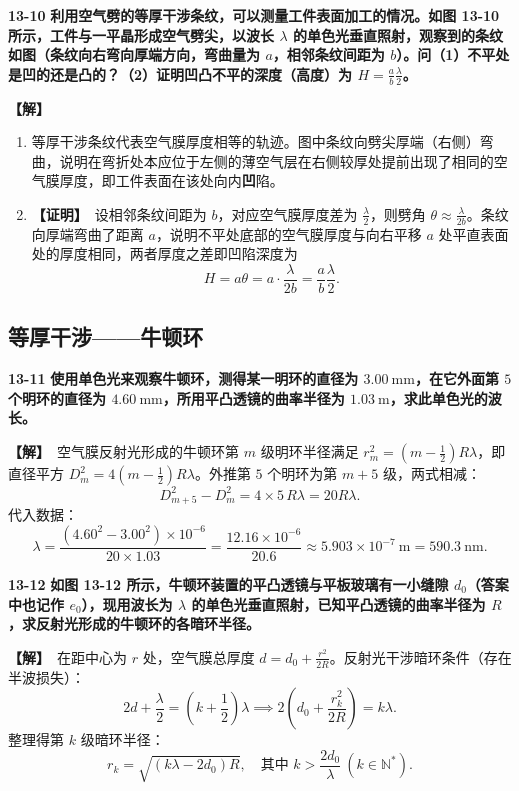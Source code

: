 \documentclass[zihao=5,a4paper,UTF8]{ctexart}
\newenvironment{prob}[2]{%
    \par\vspace{6pt}\noindent\textbf{\color{navy}#1} \textbf{#2}\par\nopagebreak\vspace{2pt}%
}{%
    \par\vspace{4pt}%
}
\newcommand{\sol}{\noindent\textbf{\color{tealaccent}【解】}\ }
\newcommand{\proofbegin}{\noindent\textbf{\color{tealaccent}【证明】}\ }
\begin{document}
\begin{prob}{13-10}{利用空气劈的等厚干涉条纹，可以测量工件表面加工的情况。如图 13-10 所示，工件与一平晶形成空气劈尖，以波长 $\lambda$ 的单色光垂直照射，观察到的条纹如图（条纹向右弯向厚端方向，弯曲量为 $a$，相邻条纹间距为 $b$）。问（1）不平处是凹的还是凸的？（2）证明凹凸不平的深度（高度）为 $H = \frac{a}{b}\frac{\lambda}{2}$。}
\sol
\begin{enumerate}[leftmargin=2em, itemsep=2pt]
    \item 等厚干涉条纹代表空气膜厚度相等的轨迹。图中条纹向劈尖厚端（右侧）弯曲，说明在弯折处本应位于左侧的薄空气层在右侧较厚处提前出现了相同的空气膜厚度，即工件表面在该处向内\textbf{凹}陷。
    \item \proofbegin 设相邻条纹间距为 $b$，对应空气膜厚度差为 $\frac{\lambda}{2}$，则劈角 $\theta \approx \frac{\lambda}{2b}$。条纹向厚端弯曲了距离 $a$，说明不平处底部的空气膜厚度与向右平移 $a$ 处平直表面处的厚度相同，两者厚度之差即凹陷深度为
    \[
        H = a\theta = a\cdot\frac{\lambda}{2b} = \frac{a}{b}\frac{\lambda}{2}.
    \]
\end{enumerate}
\end{prob}

\subsection{等厚干涉——牛顿环}

\begin{prob}{13-11}{使用单色光来观察牛顿环，测得某一明环的直径为 $3.00\ \mathrm{mm}$，在它外面第 $5$ 个明环的直径为 $4.60\ \mathrm{mm}$，所用平凸透镜的曲率半径为 $1.03\ \mathrm{m}$，求此单色光的波长。}
\sol 空气膜反射光形成的牛顿环第 $m$ 级明环半径满足 $r_m^2 = \left(m - \frac{1}{2}\right)R\lambda$，即直径平方 $D_m^2 = 4\left(m - \frac{1}{2}\right)R\lambda$。外推第 $5$ 个明环为第 $m+5$ 级，两式相减：
\[
    D_{m+5}^2 - D_m^2 = 4\times 5\,R\lambda = 20R\lambda.
\]
代入数据：
\[
    \lambda = \frac{(4.60^2 - 3.00^2)\times 10^{-6}}{20\times 1.03} = \frac{12.16\times 10^{-6}}{20.6} \approx 5.903\times 10^{-7}\ \mathrm{m} = 590.3\ \mathrm{nm}.
\]
\end{prob}

\begin{prob}{13-12}{如图 13-12 所示，牛顿环装置的平凸透镜与平板玻璃有一小缝隙 $d_0$（答案中也记作 $e_0$），现用波长为 $\lambda$ 的单色光垂直照射，已知平凸透镜的曲率半径为 $R$，求反射光形成的牛顿环的各暗环半径。}
\sol 在距中心为 $r$ 处，空气膜总厚度 $d = d_0 + \frac{r^2}{2R}$。反射光干涉暗环条件（存在半波损失）：
\[
    2d + \frac{\lambda}{2} = \left(k + \frac{1}{2}\right)\lambda \implies 2\left(d_0 + \frac{r_k^2}{2R}\right) = k\lambda.
\]
整理得第 $k$ 级暗环半径：
\[
    r_k = \sqrt{(k\lambda - 2d_0)R},\quad \text{其中 } k > \frac{2d_0}{\lambda}\ (k\in \mathbb{N}^*).
\]
\end{prob}
\end{document}
